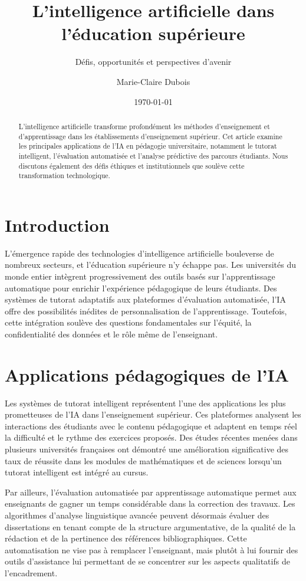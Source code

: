 \documentclass[
    language=french,
    doctype=article,
]{../../omnilatex}
\title{L'intelligence artificielle dans l'éducation supérieure}
\subtitle{Défis, opportunités et perspectives d'avenir}
\author{Marie-Claire Dubois}
\date{\today}
\begin{document}
\maketitle

\begin{abstract}
L'intelligence artificielle transforme profondément les méthodes d'enseignement et d'apprentissage dans les établissements d'enseignement supérieur. Cet article examine les principales applications de l'IA en pédagogie universitaire, notamment le tutorat intelligent, l'évaluation automatisée et l'analyse prédictive des parcours étudiants. Nous discutons également des défis éthiques et institutionnels que soulève cette transformation technologique.
\end{abstract}

\section{Introduction}
L'émergence rapide des technologies d'intelligence artificielle bouleverse de nombreux secteurs, et l'éducation supérieure n'y échappe pas. Les universités du monde entier intègrent progressivement des outils basés sur l'apprentissage automatique pour enrichir l'expérience pédagogique de leurs étudiants. Des systèmes de tutorat adaptatifs aux plateformes d'évaluation automatisée, l'IA offre des possibilités inédites de personnalisation de l'apprentissage. Toutefois, cette intégration soulève des questions fondamentales sur l'équité, la confidentialité des données et le rôle même de l'enseignant.

\section{Applications pédagogiques de l'IA}
Les systèmes de tutorat intelligent représentent l'une des applications les plus prometteuses de l'IA dans l'enseignement supérieur. Ces plateformes analysent les interactions des étudiants avec le contenu pédagogique et adaptent en temps réel la difficulté et le rythme des exercices proposés. Des études récentes menées dans plusieurs universités françaises ont démontré une amélioration significative des taux de réussite dans les modules de mathématiques et de sciences lorsqu'un tutorat intelligent est intégré au cursus.

Par ailleurs, l'évaluation automatisée par apprentissage automatique permet aux enseignants de gagner un temps considérable dans la correction des travaux. Les algorithmes d'analyse linguistique avancée peuvent désormais évaluer des dissertations en tenant compte de la structure argumentative, de la qualité de la rédaction et de la pertinence des références bibliographiques. Cette automatisation ne vise pas à remplacer l'enseignant, mais plutôt à lui fournir des outils d'assistance lui permettant de se concentrer sur les aspects qualitatifs de l'encadrement.
\end{document}
